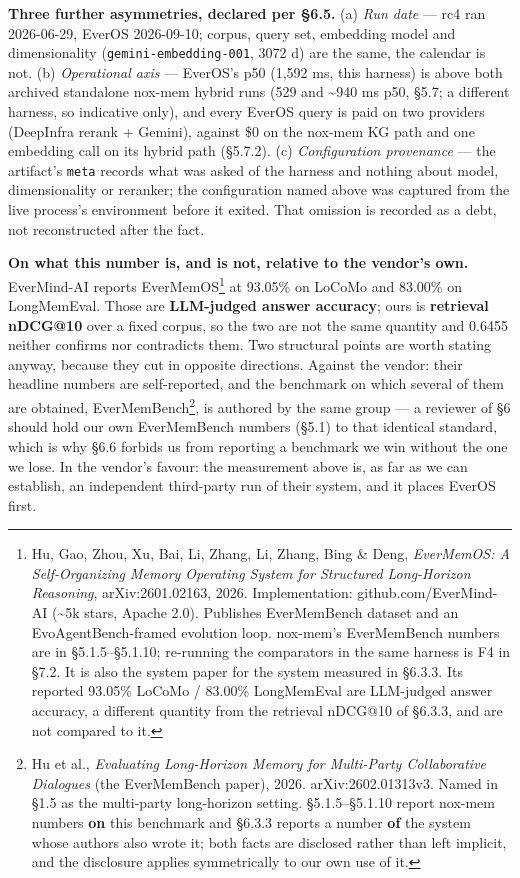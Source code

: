 \documentclass[
]{article}
\begin{document}
\textbf{Three further asymmetries, declared per §6.5.} (a) \emph{Run
date} --- rc4 ran 2026-06-29, EverOS 2026-09-10; corpus, query set,
embedding model and dimensionality (\texttt{gemini-embedding-001}, 3072
d) are the same, the calendar is not. (b) \emph{Operational axis} ---
EverOS's p50 (1,592 ms, this harness) is above both archived standalone
nox-mem hybrid runs (529 and \textasciitilde940 ms p50, §5.7; a
different harness, so indicative only), and every EverOS query is paid
on two providers (DeepInfra rerank + Gemini), against \$0 on the nox-mem
KG path and one embedding call on its hybrid path (§5.7.2). (c)
\emph{Configuration provenance} --- the artifact's \texttt{meta} records
what was asked of the harness and nothing about model, dimensionality or
reranker; the configuration named above was captured from the live
process's environment before it exited. That omission is recorded as a
debt, not reconstructed after the fact.

\textbf{On what this number is, and is not, relative to the vendor's
own.} EverMind-AI reports EverMemOS\footnote{Hu, Gao, Zhou, Xu, Bai, Li,
  Zhang, Li, Zhang, Bing \& Deng, \emph{EverMemOS: A Self-Organizing
  Memory Operating System for Structured Long-Horizon Reasoning},
  arXiv:2601.02163, 2026. Implementation: github.com/EverMind-AI
  (\textasciitilde5k stars, Apache 2.0). Publishes EverMemBench dataset
  and an EvoAgentBench-framed evolution loop. nox-mem's EverMemBench
  numbers are in §5.1.5--§5.1.10; re-running the comparators in the same
  harness is F4 in §7.2. It is also the system paper for the system
  measured in §6.3.3. Its reported 93.05\% LoCoMo / 83.00\% LongMemEval
  are LLM-judged answer accuracy, a different quantity from the
  retrieval nDCG@10 of §6.3.3, and are not compared to it.} at 93.05\%
on LoCoMo and 83.00\% on LongMemEval. Those are \textbf{LLM-judged
answer accuracy}; ours is \textbf{retrieval nDCG@10} over a fixed
corpus, so the two are not the same quantity and 0.6455 neither confirms
nor contradicts them. Two structural points are worth stating anyway,
because they cut in opposite directions. Against the vendor: their
headline numbers are self-reported, and the benchmark on which several
of them are obtained, EverMemBench\footnote{Hu et al., \emph{Evaluating
  Long-Horizon Memory for Multi-Party Collaborative Dialogues} (the
  EverMemBench paper), 2026. arXiv:2602.01313v3. Named in §1.5 as the
  multi-party long-horizon setting. §5.1.5--§5.1.10 report nox-mem
  numbers \textbf{on} this benchmark and §6.3.3 reports a number
  \textbf{of} the system whose authors also wrote it; both facts are
  disclosed rather than left implicit, and the disclosure applies
  symmetrically to our own use of it.}, is authored by the same group
--- a reviewer of §6 should hold our own EverMemBench numbers (§5.1) to
that identical standard, which is why §6.6 forbids us from reporting a
benchmark we win without the one we lose. In the vendor's favour: the
measurement above is, as far as we can establish, an independent
third-party run of their system, and it places EverOS first.
\end{document}
